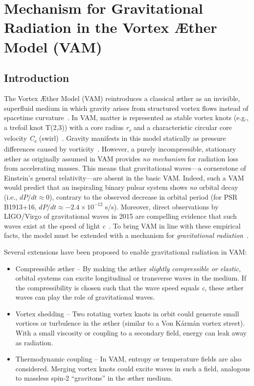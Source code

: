 

\chapter*{Mechanism for Gravitational Radiation in the Vortex Æther Model (VAM)}
\section*{Introduction}
The Vortex Æther Model (VAM) reintroduces a classical æther as an invisible, superfluid medium in which gravity arises from structured vortex flows instead of spacetime curvature~\cite{iskandarani2025VAM2}. In VAM, matter is represented as stable vortex knots (e.g., a trefoil knot T(2,3)) with a core radius \textit{r\textsubscript{c}} and a characteristic circular core velocity \textit{C\textsubscript{e}} (swirl)~\cite{iskandarani2025VAM2}. Gravity manifests in this model statically as pressure differences caused by vorticity~\cite{iskandarani2025VAM2}. However, a purely incompressible, stationary æther as originally assumed in VAM provides \textit{no mechanism} for radiation loss from accelerating masses. This means that gravitational waves—a cornerstone of Einstein's general relativity—are absent in the basic VAM. Indeed, such a VAM would predict that an inspiraling binary pulsar system shows \textit{no} orbital decay (i.e., $dP/dt \approx 0$), contrary to the observed decrease in orbital period (for PSR B1913+16, $dP/dt \approx -2.4\times10^{-12}$ s/s). Moreover, direct observations by LIGO/Virgo of gravitational waves in 2015 are compelling evidence that such waves exist at the speed of light \textit{c}~\cite{iskandarani2025VAM3}. To bring VAM in line with these empirical facts, the model must be extended with a mechanism for \textit{gravitational radiation}~\cite{iskandarani2025VAM3}.

Several extensions have been proposed to enable gravitational radiation in VAM:

\begin{itemize}
\item Compressible æther – By making the æther \textit{slightly compressible or elastic}, orbital systems can excite longitudinal or transverse waves in the medium. If the compressibility is chosen such that the wave speed equals \textit{c}, these æther waves can play the role of gravitational waves.

\item Vortex shedding – Two rotating vortex knots in orbit could generate small vortices or turbulence in the æther (similar to a Von Kármán vortex street). With a small viscosity or coupling to a secondary field, energy can leak away as radiation.

\item Thermodynamic coupling – In VAM, entropy or temperature fields are also considered. Merging vortex knots could excite waves in such a field, analogous to massless spin-2 “gravitons” in the æther medium.
\end{itemize}

